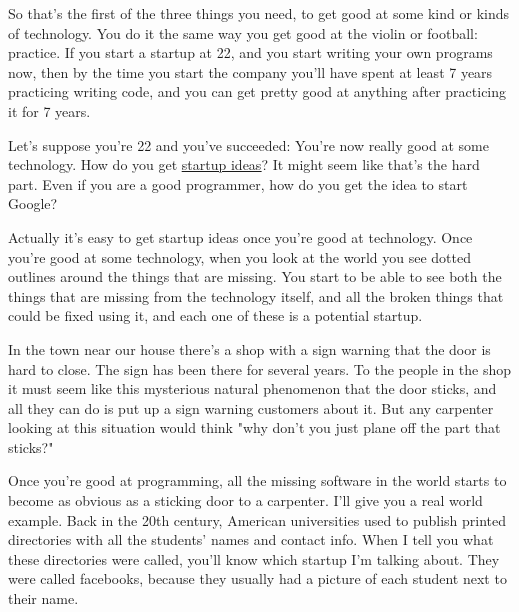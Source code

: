 So
                  that's the first of the three things you need, to get good at
                  some kind or kinds of technology. You do it the same way you
                  get good at the violin or football: practice. If you start a
                  startup at 22, and you start writing your own programs now,
                  then by the time you start the company you'll have spent at
                  least 7 years practicing writing code, and you can get pretty
                  good at anything after practicing it for 7 years.

Let's
                  suppose you're 22 and you've succeeded: You're now really good
                  at some technology. How do you get
                  \href{http://www.paulgraham.com/startupideas.html}{\underline{startup ideas}}? It might seem like that's the hard part. Even if you are a
                  good programmer, how do you get the idea to start Google?

Actually
                  it's easy to get startup ideas once you're good at technology.
                  Once you're good at some technology, when you look at the
                  world you see dotted outlines around the things that are
                  missing. You start to be able to see both the things that are
                  missing from the technology itself, and all the broken things
                  that could be fixed using it, and each one of these is a
                  potential startup.

In the town near our house
                  there's a shop with a sign warning that the door is hard to
                  close. The sign has been there for several years. To the
                  people in the shop it must seem like this mysterious natural
                  phenomenon that the door sticks, and all they can do is put up
                  a sign warning customers about it. But any carpenter looking
                  at this situation would think "why don't you just plane off
                  the part that sticks?"

Once you're good at
                  programming, all the missing software in the world starts to
                  become as obvious as a sticking door to a carpenter. I'll give
                  you a real world example. Back in the 20th century, American
                  universities used to publish printed directories with all the
                  students' names and contact info. When I tell you what these
                  directories were called, you'll know which startup I'm talking
                  about. They were called facebooks, because they usually had a
                  picture of each student next to their name.

